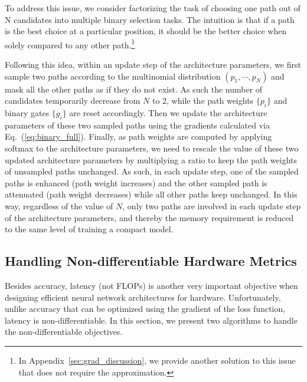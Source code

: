 \documentclass{article} \usepackage{iclr2019_conference,times}
\begin{document}
To address this issue, we consider factorizing the task of choosing one path out of N candidates into multiple binary selection tasks. The intuition is that if a path is the best choice at a particular position, it should be the better choice when solely compared to any other path.\footnote{In Appendix~\ref{sec:grad_discussion}, we provide another solution to this issue that does not require the approximation.}

Following this idea, within an update step of the architecture parameters, we first sample two paths according to the multinomial distribution $(p_1, \cdots, p_N)$ and mask all the other paths as if they do not exist. As such the number of candidates temporarily decrease from $N$ to 2, while the path weights $\{p_i\}$ and binary gates $\{g_i\}$ are reset accordingly. Then we update the architecture parameters of these two sampled paths using the gradients calculated via Eq.~(\ref{eq:binary_full}). Finally, as path weights are computed by applying softmax to the architecture parameters, we need to rescale the value of these two updated architecture parameters by multiplying a ratio to keep the path weights of unsampled paths unchanged. As such, in each update step, one of the sampled paths is enhanced (path weight increases) and the other sampled path is attenuated (path weight decreases) while all other paths keep unchanged. In this way, regardless of the value of $N$, only two paths are involved in each update step of the architecture parameters, and thereby the memory requirement is reduced to the same level of training a compact model.

\subsection{Handling Non-differentiable Hardware Metrics}
Besides accuracy, latency (not FLOPs) is another very important objective when designing efficient neural network architectures for hardware. Unfortunately, unlike accuracy that can be optimized using the gradient of the loss function, latency is non-differentiable. In this section, we present two algorithms to handle the non-differentiable objectives. 
\end{document}
